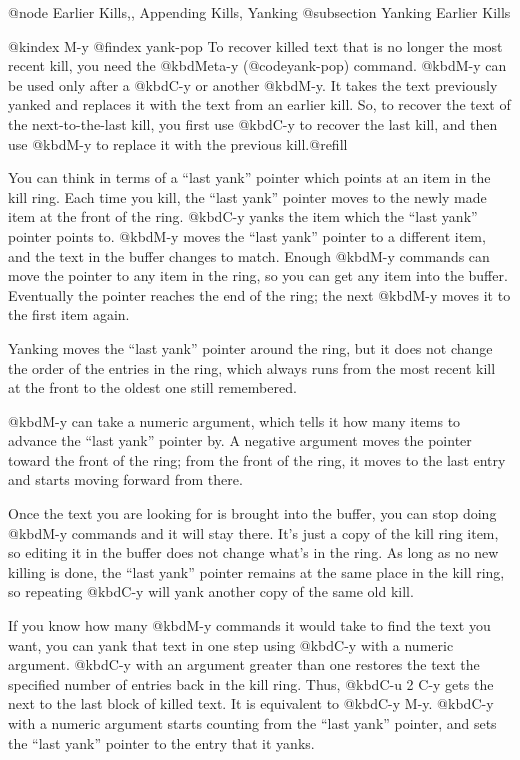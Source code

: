 {{{{{{{{@node Earlier Kills,, Appending Kills, Yanking
@subsection Yanking Earlier Kills

@kindex M-y
@findex yank-pop
  To recover killed text that is no longer the most recent kill, you need
the @kbd{Meta-y} (@code{yank-pop}) command.  @kbd{M-y} can be used only
after a @kbd{C-y} or another @kbd{M-y}.  It takes the text previously
yanked and replaces it with the text from an earlier kill.  So, to recover
the text of the next-to-the-last kill, you first use @kbd{C-y} to recover
the last kill, and then use @kbd{M-y} to replace it with the previous
kill.@refill

  You can think in terms of a ``last yank'' pointer which points at an item
in the kill ring.  Each time you kill, the ``last yank'' pointer moves to
the newly made item at the front of the ring.  @kbd{C-y} yanks the item
which the ``last yank'' pointer points to.  @kbd{M-y} moves the ``last
yank'' pointer to a different item, and the text in the buffer changes to
match.  Enough @kbd{M-y} commands can move the pointer to any item in the
ring, so you can get any item into the buffer.  Eventually the pointer
reaches the end of the ring; the next @kbd{M-y} moves it to the first item
again.

  Yanking moves the ``last yank'' pointer around the ring, but it does not
change the order of the entries in the ring, which always runs from the
most recent kill at the front to the oldest one still remembered.

  @kbd{M-y} can take a numeric argument, which tells it how many items to
advance the ``last yank'' pointer by.  A negative argument moves the
pointer toward the front of the ring; from the front of the ring, it moves
to the last entry and starts moving forward from there.

  Once the text you are looking for is brought into the buffer, you can
stop doing @kbd{M-y} commands and it will stay there.  It's just a copy of
the kill ring item, so editing it in the buffer does not change what's in
the ring.  As long as no new killing is done, the ``last yank'' pointer
remains at the same place in the kill ring, so repeating @kbd{C-y} will
yank another copy of the same old kill.

  If you know how many @kbd{M-y} commands it would take to find the
text you want, you can yank that text in one step using @kbd{C-y} with
a numeric argument.  @kbd{C-y} with an argument greater than one
restores the text the specified number of entries back in the kill
ring.  Thus, @kbd{C-u 2 C-y} gets the next to the last block of killed
text.  It is equivalent to @kbd{C-y M-y}.  @kbd{C-y} with a numeric
argument starts counting from the ``last yank'' pointer, and sets the
``last yank'' pointer to the entry that it yanks.

}}}}}}}}
